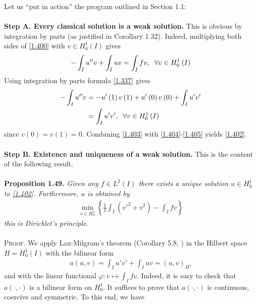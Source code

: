 \documentclass[a4paper,oneside]{book}
\numberwithin{equation}{chapter}
\begin{document}
Let us ``put in action'' the program outlined in Section 1.1:\\
\\
\textbf{Step A. Every classical solution is a weak solution.} This is obvious by integration by parts (as justified in Corollary 1.32). Indeed, multiplying both sides of \eqref{1.400} with $v\in H_0^1\left(I\right)$ gives
\begin{align}
\label{1.403}
 - \int_I {u''v}  + \int_I {uv}  = \int_I {fv} ,\hspace{0.2cm}\forall v \in H_0^1\left( I \right)
\end{align}
Using integration by parts formula \eqref{1.337} gives
\begin{align}
\label{1.404}
 - \int_I {u''v}  &=  - u'\left( 1 \right)v\left( 1 \right) + u'\left( 0 \right)v\left( 0 \right) + \int_I {u'v'} \\
& = \int_I {u'v'}  ,\hspace{0.2cm}\forall v \in H_0^1\left( I \right) \label{1.405}
\end{align}
since $v\left(0\right)=v\left(1\right)=0$. Combining \eqref{1.403} with \eqref{1.404}-\eqref{1.405} yields \eqref{1.402}.\\
\\
\textbf{Step B. Existence and uniqueness of a weak solution.} This is the content of the following result.\\
\\
\textbf{Proposition 1.49.} \textit{Given any $f\in L^2\left(I\right)$ there exists a unique solution $u\in H_0^1$ to \eqref{1.402}. Furthermore, $u$ is obtained by}
\begin{align}
\label{1.406}
\mathop {\min }\limits_{v \in H_0^1} \left\{ {\frac{1}{2}\int_I {\left( {v{'^2} + {v^2}} \right)}  - \int_I {fv} } \right\}
\end{align}
\textit{this is Dirichlet's principle.}\\
\\
\textsc{Proof.} We apply Lax-Milgram's theorem (Corollary 5.8, \cite{1}) in the Hilbert space $H=H_0^1\left(I\right)$ with the bilinear form
\begin{align}
\label{1.407}
a\left( {u,v} \right) = \int_I {u'v'}  + \int_I {uv}  = {\left( {u,v} \right)_{{H^1}}}
\end{align}
and with the linear functional $\varphi :v \mapsto \int_I {fv} $. Indeed, it is easy to check that $a\left( { \cdot , \cdot } \right)$ is a bilinear form on $H_0^1$. It suffices to prove that $a\left( { \cdot , \cdot } \right)$ is continuous, coercive and symmetric. To this end, we have
\end{document}
